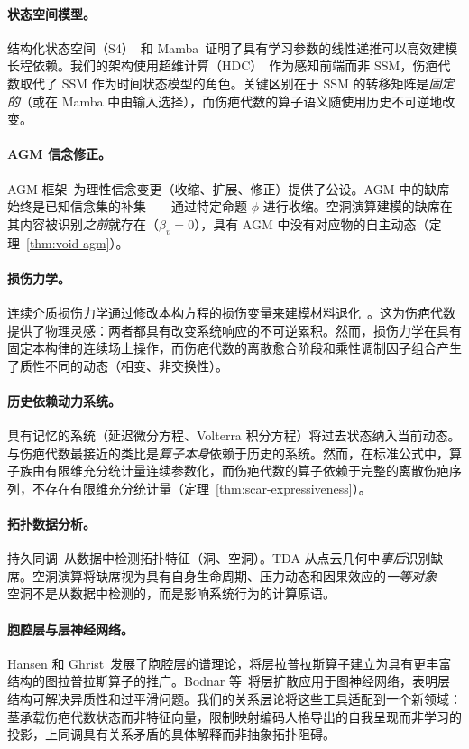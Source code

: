 \documentclass[11pt]{article}
\begin{document}
\paragraph{状态空间模型。}
结构化状态空间（S4）~\cite{gu2022}和 Mamba~\cite{gu2023}证明了具有学习参数的线性递推可以高效建模长程依赖。我们的架构使用超维计算（HDC）~\cite{kanerva2009}作为感知前端而非 SSM，伤疤代数取代了 SSM 作为时间状态模型的角色。关键区别在于 SSM 的转移矩阵是\emph{固定的}（或在 Mamba 中由输入选择），而伤疤代数的算子语义随使用历史不可逆地改变。

\paragraph{AGM 信念修正。}
AGM 框架~\cite{agm1985}为理性信念变更（收缩、扩展、修正）提供了公设。AGM 中的缺席始终是已知信念集的补集——通过特定命题 $\phi$ 进行收缩。空洞演算建模的缺席在其内容被识别\emph{之前}就存在（$\beta_v = 0$），具有 AGM 中没有对应物的自主动态（定理~\ref{thm:void-agm}）。

\paragraph{损伤力学。}
连续介质损伤力学通过修改本构方程的损伤变量来建模材料退化~\cite{lemaitre1996}。这为伤疤代数提供了物理灵感：两者都具有改变系统响应的不可逆累积。然而，损伤力学在具有固定本构律的连续场上操作，而伤疤代数的离散愈合阶段和乘性调制因子组合产生了质性不同的动态（相变、非交换性）。

\paragraph{历史依赖动力系统。}
具有记忆的系统（延迟微分方程、Volterra 积分方程）将过去状态纳入当前动态。与伤疤代数最接近的类比是\emph{算子本身}依赖于历史的系统。然而，在标准公式中，算子族由有限维充分统计量连续参数化，而伤疤代数的算子依赖于完整的离散伤疤序列，不存在有限维充分统计量（定理~\ref{thm:scar-expressiveness}）。

\paragraph{拓扑数据分析。}
持久同调~\cite{edelsbrunner2010}从数据中检测拓扑特征（洞、空洞）。TDA 从点云几何中\emph{事后}识别缺席。空洞演算将缺席视为具有自身生命周期、压力动态和因果效应的\emph{一等对象}——空洞不是从数据中检测的，而是影响系统行为的计算原语。

\paragraph{胞腔层与层神经网络。}
Hansen 和 Ghrist~\cite{hansen2019}发展了胞腔层的谱理论，将层拉普拉斯算子建立为具有更丰富结构的图拉普拉斯算子的推广。Bodnar 等~\cite{bodnar2022}将层扩散应用于图神经网络，表明层结构可解决异质性和过平滑问题。我们的关系层论将这些工具适配到一个新领域：茎承载伤疤代数状态而非特征向量，限制映射编码人格导出的自我呈现而非学习的投影，上同调具有关系矛盾的具体解释而非抽象拓扑阻碍。
\end{document}
